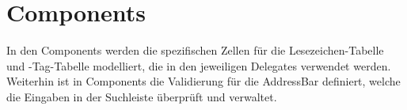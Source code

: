 
\section{Components}

In den Components werden die spezifischen Zellen für die Lesezeichen-Tabelle und \SEARCH-Tag-Tabelle modelliert, die in den jeweiligen Delegates verwendet werden. Weiterhin ist in Components die Validierung für die AddressBar definiert, welche die Eingaben in der Suchleiste überprüft und verwaltet.
